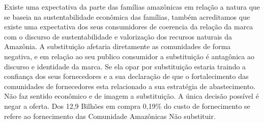 Existe uma expectativa da parte das famílias amazônicas em relação a natura que se baseia na sustentabilidade econômica das famílias, também acreditamos que existe uma expectativa dos seus consumidores de coerencia da relação da marca com o discurso de sustentabilidade e valorização dos recursos naturais da Amazônia.
A substituição afetaria diretamente as comunidades de forma negativa, e em relação ao seu publico consumidor a substituição é antagônica ao discurso e identidade da marca.
Se ela opar por substituição estaria traindo a confiança dos seus fornecedores e a sua declaração de que o fortalecimento das comunidades de fornecedores esta relacionado a sua estratégia de abastecimento.
Não faz sentido econômico e de imagem a substituição. A única decisão possível é negar a oferta. Dos 12,9 Bilhões em compra 0,19\% do custo de fornecimento se refere ao fornecimento das Comunidade Amazônicas
Não substituir.
